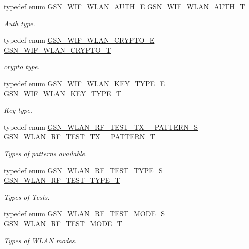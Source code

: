\begin{DoxyCompactItemize}
typedef enum \hyperlink{a00677_ga2b3917a91d576d0d037c406e6397cab9}{GSN\_\-WIF\_\-WLAN\_\-AUTH\_\-E} \hyperlink{a00677_ga07b4b8b059f529183cc5da3aadfa2966}{GSN\_\-WIF\_\-WLAN\_\-AUTH\_\-T}
\begin{DoxyCompactList}\small\item\em Auth type. \end{DoxyCompactList}\item 
typedef enum \hyperlink{a00677_ga49c8ff4188538f53965f3e0916f59746}{GSN\_\-WIF\_\-WLAN\_\-CRYPTO\_\-E} \hyperlink{a00677_gac2cbed9ce43ac5da06c3a3396bbaaf31}{GSN\_\-WIF\_\-WLAN\_\-CRYPTO\_\-T}
\begin{DoxyCompactList}\small\item\em crypto type. \end{DoxyCompactList}\item 
typedef enum \hyperlink{a00677_ga738f68b803d29587618534b884d8b600}{GSN\_\-WIF\_\-WLAN\_\-KEY\_\-TYPE\_\-E} \hyperlink{a00677_gab0871ec1fe022833d9573d32749bd7c4}{GSN\_\-WIF\_\-WLAN\_\-KEY\_\-TYPE\_\-T}
\begin{DoxyCompactList}\small\item\em Key type. \end{DoxyCompactList}\item 
typedef enum \hyperlink{a00677_ga651010efc8cff4e360fd72c7d32a70a9}{GSN\_\-WLAN\_\-RF\_\-TEST\_\-TX\_\_\-PATTERN\_\-S} \hyperlink{a00677_gaf2d0e783b6db5c93a78ee3d99153ebcb}{GSN\_\-WLAN\_\-RF\_\-TEST\_\-TX\_\_\-PATTERN\_\-T}
\begin{DoxyCompactList}\small\item\em Types of patterns available. \end{DoxyCompactList}\item 
typedef enum \hyperlink{a00677_ga3c5fd791827dffd656e69ad09ce2304e}{GSN\_\-WLAN\_\-RF\_\-TEST\_\-TYPE\_\-S} \hyperlink{a00677_ga58d933da4429968a4151ae6b2106281b}{GSN\_\-WLAN\_\-RF\_\-TEST\_\-TYPE\_\-T}
\begin{DoxyCompactList}\small\item\em Types of Tests. \end{DoxyCompactList}\item 
typedef enum \hyperlink{a00677_ga8d2c2dc6c9f7927c5cf4634d7b403b95}{GSN\_\-WLAN\_\-RF\_\-TEST\_\-MODE\_\-S} \hyperlink{a00677_ga05896005da162a0b0f4b304f7c551947}{GSN\_\-WLAN\_\-RF\_\-TEST\_\-MODE\_\-T}
\begin{DoxyCompactList}\small\item\em Types of WLAN modes. \end{DoxyCompactList}\item 

\end{DoxyCompactItemize}
